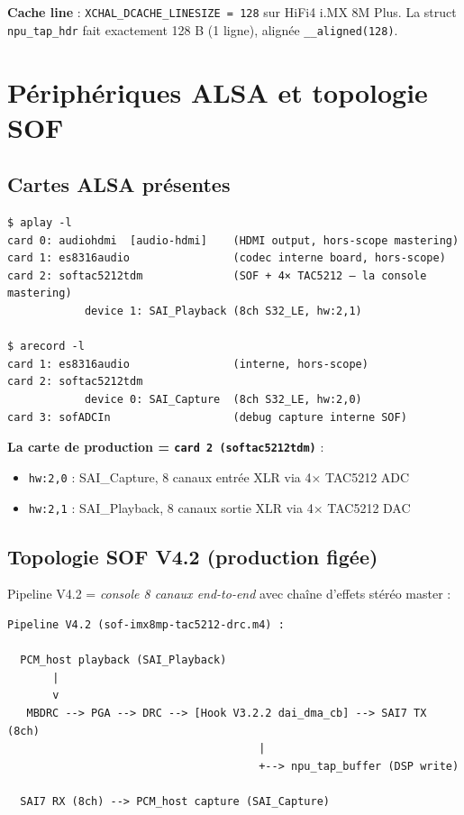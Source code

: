 \documentclass[11pt,a4paper]{article}
\begin{document}
\textbf{Cache line} : \texttt{XCHAL\_DCACHE\_LINESIZE = 128} sur HiFi4 i.MX 8M Plus.
La struct \texttt{npu\_tap\_hdr} fait exactement 128 B (1 ligne), alignée
\texttt{\_\_aligned(128)}.

\section{Périphériques ALSA et topologie SOF}

\subsection{Cartes ALSA présentes}

\begin{lstlisting}
$ aplay -l
card 0: audiohdmi  [audio-hdmi]    (HDMI output, hors-scope mastering)
card 1: es8316audio                (codec interne board, hors-scope)
card 2: softac5212tdm              (SOF + 4× TAC5212 — la console mastering)
            device 1: SAI_Playback (8ch S32_LE, hw:2,1)

$ arecord -l
card 1: es8316audio                (interne, hors-scope)
card 2: softac5212tdm
            device 0: SAI_Capture  (8ch S32_LE, hw:2,0)
card 3: sofADCIn                   (debug capture interne SOF)
\end{lstlisting}

\textbf{La carte de production = \texttt{card 2 (softac5212tdm)}} :
\begin{itemize}[leftmargin=1.2em]
\item \texttt{hw:2,0} : SAI\_Capture, 8 canaux entrée XLR via 4× TAC5212 ADC
\item \texttt{hw:2,1} : SAI\_Playback, 8 canaux sortie XLR via 4× TAC5212 DAC
\end{itemize}

\subsection{Topologie SOF V4.2 (production figée)}

Pipeline V4.2 = \emph{console 8 canaux end-to-end} avec chaîne d'effets stéréo
master :

\begin{lstlisting}
Pipeline V4.2 (sof-imx8mp-tac5212-drc.m4) :

  PCM_host playback (SAI_Playback)
       |
       v
   MBDRC --> PGA --> DRC --> [Hook V3.2.2 dai_dma_cb] --> SAI7 TX (8ch)
                                       |
                                       +--> npu_tap_buffer (DSP write)

  SAI7 RX (8ch) --> PCM_host capture (SAI_Capture)
\end{lstlisting}
\end{document}
